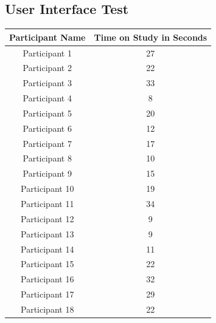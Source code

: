 \subsection*{User Interface Test}\label{appendix:heatmapTimes}

\begin{table}[htbp]
    \centering
    \begin{tabular}{|c|c|}
    \hline
    \textbf{Participant Name} & \textbf{Time on Study in Seconds} \\ \hline
    Participant 1             & 27                                \\ \hline
    Participant 2             & 22                                \\ \hline
    Participant 3             & 33                                \\ \hline
    Participant 4             & 8                                \\ \hline
    Participant 5             & 20                                \\ \hline
    Participant 6             & 12                                \\ \hline
    Participant 7             & 17                                \\ \hline
    Participant 8             & 10                                \\ \hline
    Participant 9             & 15                                \\ \hline
    Participant 10             & 19                                \\ \hline
    Participant 11             & 34                                \\ \hline
    Participant 12             & 9                                \\ \hline
    Participant 13             & 9                                \\ \hline
    Participant 14             & 11                                \\ \hline
    Participant 15             & 22                                \\ \hline
    Participant 16             & 32                                \\ \hline
    Participant 17             & 29                                \\ \hline
    Participant 18             & 22                                \\ \hline

\end{tabular}
\end{table}
